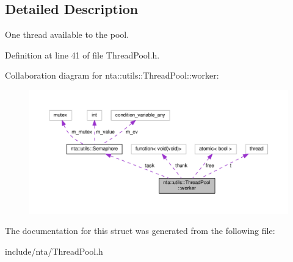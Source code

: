 \subsection{Detailed Description}
One thread available to the pool. 

Definition at line 41 of file Thread\+Pool.\+h.



Collaboration diagram for nta\+:\+:utils\+:\+:Thread\+Pool\+:\+:worker\+:\nopagebreak
\begin{figure}[H]
\begin{center}
\leavevmode
\includegraphics[width=350pt]{da/d21/structnta_1_1utils_1_1ThreadPool_1_1worker__coll__graph}
\end{center}
\end{figure}


The documentation for this struct was generated from the following file\+:\begin{DoxyCompactItemize}
\item 
include/nta/Thread\+Pool.\+h\end{DoxyCompactItemize}
